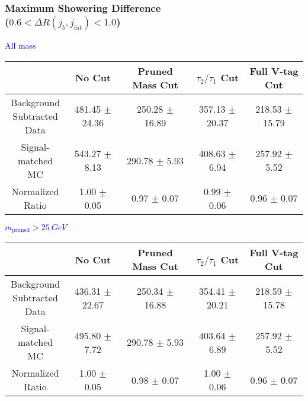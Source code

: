 \documentclass{beamer}
\begin{document}
\begin{frame}
  \frametitle{Maximum Showering Difference \\ ($0.6 < \Delta R(j_b,j_\text{fat}) < 1.0$)}
  \begin{adjustwidth}{-1.5em}{-1.5em}
    \centering
    \vspace{6pt}
    \textcolor{blue}{All mass}
    \vspace{6pt}

    {\scriptsize
      \begin{tabular}{c | c | c | c | c}
        \hline
        & No Cut & Pruned Mass Cut & $\tau_2/\tau_1$ Cut & Full V-tag Cut \\
        \hline
        \makecell{Background \\ Subtracted \\ Data} & 481.45 $\pm$ 24.36 & 250.28 $\pm$ 16.89 & 357.13 $\pm$ 20.37 & 218.53 $\pm$ 15.79 \\
        \makecell{Signal-\\ matched MC} & 543.27 $\pm$ 8.13 & 290.78 $\pm$ 5.93 & 408.63 $\pm$ 6.94 & 257.92 $\pm$ 5.52 \\
        \hline
        \makecell{Normalized \\ Ratio} & 1.00 $\pm$ 0.05 & 0.97 $\pm$ 0.07 & 0.99 $\pm$ 0.06 & 0.96 $\pm$ 0.07 \\
        \hline
      \end{tabular}
    }

    \vspace{6pt}
    \textcolor{blue}{$m_\text{pruned} > \SI{25}{GeV}$}
    \vspace{6pt}

    {\scriptsize
      \begin{tabular}{c | c | c | c | c}
        \hline
        & No Cut & Pruned Mass Cut & $\tau_2/\tau_1$ Cut & Full V-tag Cut \\
        \hline
        \makecell{Background \\ Subtracted \\ Data} & 436.31 $\pm$ 22.67 & 250.34 $\pm$ 16.88 & 354.41 $\pm$ 20.21 & 218.59 $\pm$ 15.78 \\
        \makecell{Signal-\\ matched MC} & 495.80 $\pm$ 7.72 & 290.78 $\pm$ 5.93 & 403.64 $\pm$ 6.89 & 257.92 $\pm$ 5.52 \\
        \hline
        \makecell{Normalized \\ Ratio} & 1.00 $\pm$ 0.05 & 0.98 $\pm$ 0.07 & 1.00 $\pm$ 0.06 & 0.96 $\pm$ 0.07 \\
        \hline
      \end{tabular}
    }
  \end{adjustwidth}
\end{frame}
\end{document}
